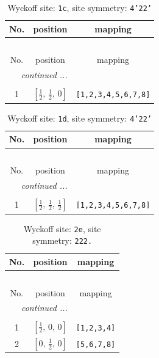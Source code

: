 \documentclass[fleqn,8pt]{jsarticle}
\begin{document}
\begin{longtable}{ccc}
\caption{Wyckoff site: {\tt 1c}, site symmetry: {\tt 4'22'}}
 \\
 \hline \hline
No. & position & mapping \\ \hline \endfirsthead

\multicolumn{2}{l}{\tablename\ \thetable{}} \\
 \hline \hline
No. & position & mapping \\ \hline \endhead

 \hline \hline
\multicolumn{2}{r}{\footnotesize\it continued ...} \\ \endfoot

 \hline \hline
\multicolumn{2}{r}{} \\ \endlastfoot

1 & $\left[ \frac{1}{2},\, \frac{1}{2},\, 0 \right]$ & {\tt [1,2,3,4,5,6,7,8]} \\
\end{longtable}
\renewcommand{\arraystretch}{1.2}
\begin{longtable}{ccc}
\caption{Wyckoff site: {\tt 1d}, site symmetry: {\tt 4'22'}}
 \\
 \hline \hline
No. & position & mapping \\ \hline \endfirsthead

\multicolumn{2}{l}{\tablename\ \thetable{}} \\
 \hline \hline
No. & position & mapping \\ \hline \endhead

 \hline \hline
\multicolumn{2}{r}{\footnotesize\it continued ...} \\ \endfoot

 \hline \hline
\multicolumn{2}{r}{} \\ \endlastfoot

1 & $\left[ \frac{1}{2},\, \frac{1}{2},\, \frac{1}{2} \right]$ & {\tt [1,2,3,4,5,6,7,8]} \\
\end{longtable}
\renewcommand{\arraystretch}{1.2}
\begin{longtable}{ccc}
\caption{Wyckoff site: {\tt 2e}, site symmetry: {\tt 222.}}
 \\
 \hline \hline
No. & position & mapping \\ \hline \endfirsthead

\multicolumn{2}{l}{\tablename\ \thetable{}} \\
 \hline \hline
No. & position & mapping \\ \hline \endhead

 \hline \hline
\multicolumn{2}{r}{\footnotesize\it continued ...} \\ \endfoot

 \hline \hline
\multicolumn{2}{r}{} \\ \endlastfoot

1 & $\left[ \frac{1}{2},\, 0,\, 0 \right]$ & {\tt [1,2,3,4]} \\ \hline
2 & $\left[ 0,\, \frac{1}{2},\, 0 \right]$ & {\tt [5,6,7,8]} \\
\end{longtable}
\end{document}
